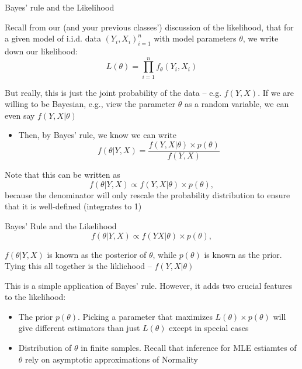 \documentclass[notes,11pt, aspectratio=169]{beamer}
\newenvironment{wideitemize}{\itemize\addtolength{\itemsep}{10pt}}{\enditemize}
\begin{document}
\begin{frame}{Bayes' rule and the Likelihood}
  \begin{wideitemize}
  \item Recall from our (and your previous classes') discussion of the
    likelihood, that for a given model of i.i.d. data $(Y_{i},X_{i})_{i=1}^{n}$ with model parameters $\theta$, we write down our likelihood:
    \begin{equation*}
      L(\theta) = \prod_{i=1}^{n}f_{\theta}(Y_{i} , X_{i}) 
    \end{equation*}
  \item But really, this is just the joint probability of the data -- e.g. $f(Y , X)$. If we are willing to be Bayesian, e.g., view the parameter $\theta$ as a random variable, we can even say $f(Y , X |  \theta)$
    \begin{itemize}
    \item Then, by Bayes' rule, we know we can write
      \begin{equation*}
        f(\theta | Y, X) = \frac{f(Y , X | \theta) \times p(\theta)}{f(Y,X)}
      \end{equation*}
    \end{itemize}
    \item Note that this can be written as
      \begin{equation*}
        f(\theta | Y, X) \propto f(Y,  X | \theta) \times p(\theta),
      \end{equation*}
      because the denominator will only rescale the probability
      distribution to ensure that it is well-defined (integrates to 1)
  \end{wideitemize}
\end{frame}

\begin{frame}{Bayes' Rule and the Likelihood}
      \begin{equation*}
        f(\theta | Y, X) \propto f(Y X| \theta) \times p(\theta),
      \end{equation*}
  \begin{wideitemize}
  \item $f(\theta | Y, X)$ is known as the posterior of $\theta$,
    while $p(\theta)$ is known as the prior. Tying this all together is
    the likliehood -- $f(Y, X | \theta)$
  \item This is a simple application of Bayes' rule. However, it adds
    two crucial features to the likelihood:
    \begin{itemize}
    \item The prior $p(\theta)$. Picking a parameter that maximizes
      $L(\theta) \times p(\theta)$ will give different estimators than
      just $L(\theta)$ except in special cases
    \item Distribution of $\theta$ in finite samples. Recall that
      inference for MLE estiamtes of $\theta$ rely on asymptotic
      approximations of Normality
    \end{itemize}
  \end{wideitemize}
\end{frame}
\end{document}
